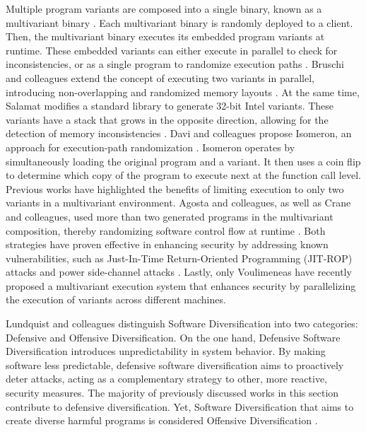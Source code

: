 \begin{strategy}
    Multiple program variants are composed into a single binary, known as a multivariant binary \cite{cox06}. 
    Each multivariant binary is randomly deployed to a client.
    Then, the multivariant binary executes its embedded program variants at runtime. 
    These embedded variants can either execute in parallel to check for inconsistencies, or as a single program to randomize execution paths \cite{bhatkar03}. 
    Bruschi and colleagues extend the concept of executing two variants in parallel, introducing non-overlapping and randomized memory layouts \cite{bruschi2007diversified}. 
    At the same time, Salamat \etal modifies a standard library to generate 32-bit Intel variants. 
    These variants have a stack that grows in the opposite direction, allowing for the detection of memory inconsistencies \cite{salamat2007stopping}. 
    Davi and colleagues propose Isomeron, an approach for execution-path randomization \cite{davi2015isomeron}. 
    Isomeron operates by simultaneously loading the original program and a variant. 
    It then uses a coin flip to determine which copy of the program to execute next at the function call level. 
    Previous works have highlighted the benefits of limiting execution to only two variants in a multivariant environment. 
    Agosta and colleagues, as well as Crane and colleagues, used more than two generated programs in the multivariant composition, thereby randomizing software control flow at runtime \cite{agosta2015meet, crane2015thwarting}. 
    Both strategies have proven effective in enhancing security by addressing known vulnerabilities, such as Just-In-Time Return-Oriented Programming (JIT-ROP) attacks \cite{jackson2011compiler} and power side-channel attacks \cite{amarilli2011can}. 
    Lastly, only Voulimeneas \etal \cite{voulimeneas2021dmvx} have recently proposed a multivariant execution system that enhances security by parallelizing the execution of variants across different machines.
\end{strategy}

\label{offensive_definition}
Lundquist and colleagues \cite{offensive_div} distinguish Software Diversification into two categories: Defensive and Offensive Diversification. 
On the one hand, Defensive Software Diversification introduces unpredictability in system behavior. 
By making software less predictable, defensive software diversification aims to proactively deter attacks, acting as a complementary strategy to other, more reactive, security measures. 
The majority of previously discussed works in this section contribute to defensive diversification.
Yet, Software Diversification that aims to create diverse harmful programs is considered Offensive Diversification \cite{fred1986computer}.


